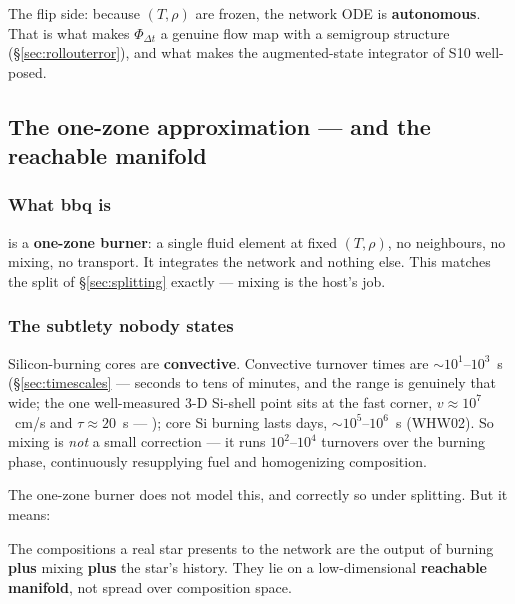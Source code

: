 The flip side: because $(T, \rho)$ are frozen, the network ODE is
\textbf{autonomous}. That is what makes $\Phi_{\Delta t}$ a genuine flow map with
a semigroup structure (\S\ref{sec:rollouterror}), and what makes the
augmented-state integrator of S10 well-posed.

\subsection{The one-zone approximation --- and the reachable manifold}
\label{sec:onezone}

\subsubsection{What bbq is}
\label{sec:whatisbbq}

 is a \textbf{one-zone burner}: a single fluid element at fixed
$(T, \rho)$, no neighbours, no mixing, no transport. It integrates the network
and nothing else. This matches the split of \S\ref{sec:splitting} exactly ---
mixing is the host's job.

\subsubsection{The subtlety nobody states}
\label{sec:convectivesubtlety}

Silicon-burning cores are \textbf{convective}. Convective turnover times are
${\sim}10^{1}$--$10^{3}$~s (\S\ref{sec:timescales} --- seconds to tens of
minutes, and the range is genuinely that wide; the one well-measured 3-D
Si-shell point sits at the fast corner, $v \approx 10^{7}$~cm/s and
$\tau \approx 20$~s --- \citealt{couch2015}); core Si burning lasts days,
${\sim}10^{5}$--$10^{6}$~s (WHW02). So mixing is \emph{not} a small correction
--- it runs $10^{2}$--$10^{4}$ turnovers over the burning phase, continuously
resupplying fuel and homogenizing composition.

The one-zone burner does not model this, and correctly so under splitting. But
it means:

\begin{result}
The compositions a real star presents to the network are the output of burning
\textbf{plus} mixing \textbf{plus} the star's history. They lie on a
low-dimensional \textbf{reachable manifold}, not spread over composition space.
\end{result}

